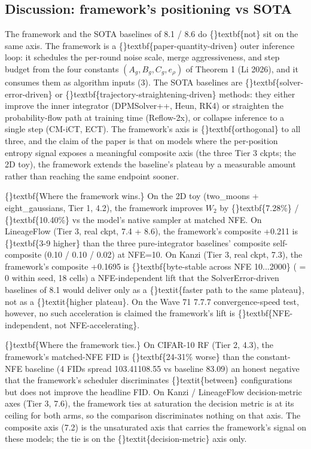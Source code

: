 \documentclass{article}
\begin{document}
\subsection{Discussion: framework's positioning vs SOTA}
The framework and the SOTA baselines of 8.1 / 8.6 do \{\}textbf\{not\} sit on the same axis. The framework is a \{\}textbf\{paper-quantity-driven\} outer inference loop: it schedules the per-round noise scale, merge aggressiveness, and step budget from the four constants $(A_g, B_g, C_g, e_\rho)$ of Theorem 1 (Li 2026), and it consumes them as algorithm inputs (3). The SOTA baselines are \{\}textbf\{solver-error-driven\} or \{\}textbf\{trajectory-straightening-driven\} methods: they either improve the inner integrator (DPMSolver++, Heun, RK4) or straighten the probability-flow path at training time (Reflow-2x), or collapse inference to a single step (CM-iCT, ECT). The framework's axis is \{\}textbf\{orthogonal\} to all three, and the claim of the paper is that on models where the per-position entropy signal exposes a meaningful composite axis (the three Tier 3 ckpts; the 2D toy), the framework extends the baseline's plateau by a measurable amount rather than reaching the same endpoint sooner.

\{\}textbf\{Where the framework wins.\} On the 2D toy (two\_moons + eight\_gaussians, Tier 1, 4.2), the framework improves $W_2$ by \{\}textbf\{7.28\%\} / \{\}textbf\{10.40\%\} vs the model's native sampler at matched NFE. On LineageFlow (Tier 3, real ckpt, 7.4 + 8.6), the framework's composite +0.211 is \{\}textbf\{3-9 higher\} than the three pure-integrator baselines' composite self-composite (0.10 / 0.10 / 0.02) at NFE=10. On Kanzi (Tier 3, real ckpt, 7.3), the framework's composite +0.1695 is \{\}textbf\{byte-stable across NFE 10...2000\} ( = 0 within seed, 18 cells)  a NFE-independent lift that the SolverError-driven baselines of 8.1 would deliver only as a \{\}textit\{faster path to the same plateau\}, not as a \{\}textit\{higher plateau\}. On the Wave 71 7.7.7 convergence-speed test, however, no such acceleration is claimed  the framework's lift is \{\}textbf\{NFE-independent, not NFE-accelerating\}.

\{\}textbf\{Where the framework ties.\} On CIFAR-10 RF (Tier 2, 4.3), the framework's matched-NFE FID is \{\}textbf\{24-31\% worse\} than the constant-NFE baseline (4 FIDs spread 103.41108.55 vs baseline 83.09)  an honest negative that the framework's scheduler discriminates \{\}textit\{between\} configurations but does not improve the headline FID. On Kanzi / LineageFlow decision-metric axes (Tier 3, 7.6), the framework ties at saturation  the decision metric is at its ceiling for both arms, so the comparison discriminates nothing on that axis. The composite axis (7.2) is the unsaturated axis that carries the framework's signal on these models; the tie is on the \{\}textit\{decision-metric\} axis only.
\end{document}
